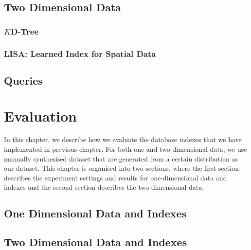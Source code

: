 \documentclass[a4paper,12pt]{scrreprt}
\newenvironment{mscsummary}{\fbox{Summary}}{\\}
\begin{document}


\section{Two Dimensional Data}

\subsection{$K$D-Tree}



\subsection{LISA: Learned Index for Spatial Data}



\section{Queries}



\chapter{Evaluation}

\begin{mscsummary}
	In this chapter, we describe how we evaluate the database indexes that we have implemented in previous chapter. For both one and two dimensional data, we use manually synthesised dataset that are generated from a certain distribution as our dataset. This chapter is organised into two sections, where the first section describes the experiment settings and results for one-dimensional data and indexes and the second section describes the two-dimensional data.
\end{mscsummary}

\section{One Dimensional Data and Indexes}



\section{Two Dimensional Data and Indexes}
\end{document}
